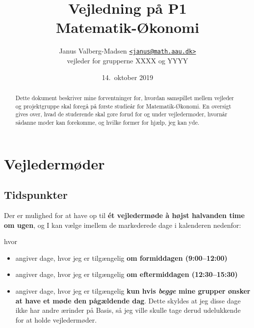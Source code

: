 \documentclass[12pt,a4paper,oneside,final]{article}
\title{
  Vejledning p{\aa} P1\\
  Matematik-{\O}konomi
}
\author{
  Janus Valberg-Madsen \href{mailto:janus@math.aau.dk}{\texttt{<janus@math.aau.dk>}}\\
  vejleder for grupperne XXXX og YYYY
}
\date{14.\ oktober 2019}
\begin{document}
\maketitle

\renewcommand{\abstractname}{Om dette dokument}
\begin{abstract}
  Dette dokument beskriver mine forventninger for, hvordan samspillet mellem vejleder og projektgruppe skal foregå på første studieår for Matematik-Økonomi.
  En oversigt gives over, hvad de studerende skal gøre forud for og under vejledermøder, hvornår sådanne møder kan forekomme, og hvilke former for hjælp, jeg kan yde.
\end{abstract}


\section{Vejledermøder}
\subsection{Tidspunkter}
\label{subsec:tidspunkter}
Der er mulighed for at have op til \textbf{\'et vejledermøde \`a højst halvanden time om ugen}, og I kan vælge imellem de markederede dage i kalenderen nedenfor:
\begin{center}
  
\end{center}
hvor
\begin{itemize}[label={},wide,labelindent=0pt,topsep=1ex]
\item {} angiver dage, hvor jeg er tilgængelig \textbf{om formiddagen (9:00--12:00)}
\item {} angiver dage, hvor jeg er tilgængelig \textbf{om eftermiddagen (12:30--15:30)}
\item {} angiver dage, hvor jeg er tilgængelig \textbf{kun hvis \emph{begge} mine grupper ønsker at have et møde den pågældende dag}.
  Dette skyldes at jeg disse dage ikke har andre ærinder på Basis, så jeg ville skulle tage derud udelukkende for at holde vejledermøder.
\end{itemize}

\clearpage
\end{document}
